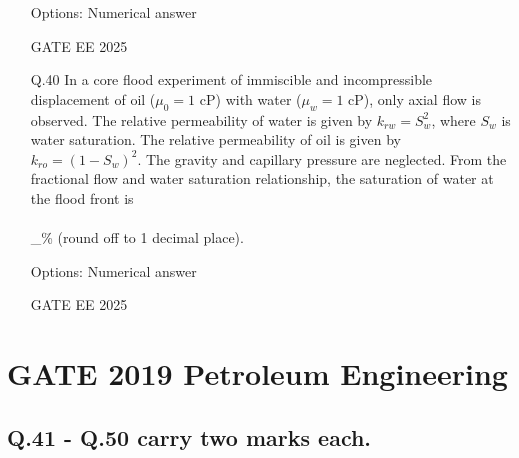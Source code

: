 \documentclass[journal]{IEEEtran}
\begin{document}
\begin{enumerate}[leftmargin=*,series=q]
Options: Numerical answer

GATE EE 2025
 \vspace{0.5cm} 
\item[Q.40] In a core flood experiment of immiscible and incompressible displacement of oil ($\mu_0 = 1$ cP) with water ($\mu_w = 1$ cP), only axial flow is observed. The relative permeability of water is given by $k_{rw} = S_w^2$, where $S_w$ is water saturation. The relative permeability of oil is given by $k_{ro} = (1 - S_w)^2$. The gravity and capillary pressure are neglected. From the fractional flow and water saturation relationship, the saturation of water at the flood front is \\\\\_\% (round off to 1 decimal place).

Options: Numerical answer

GATE EE 2025
 \vspace{0.5cm} 
\end{enumerate}


\section*{GATE 2019 Petroleum Engineering}

\subsection*{Q.41 - Q.50 carry two marks each.}
\end{document}
